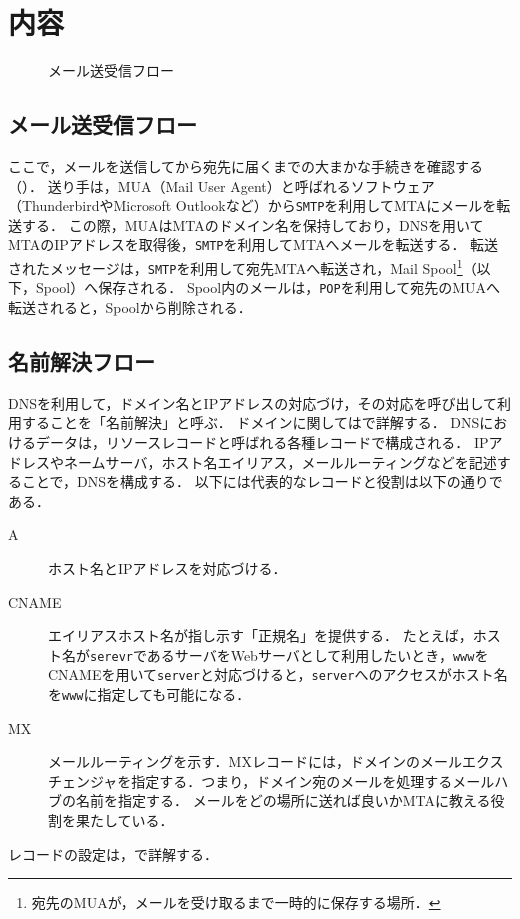 \chapter{内容}
\begin{wrapfigure}{r}[0mm]{.43\textwidth}
    
    \caption{メール送受信フロー\footnotemark[2]}
    \label{fig:メール送受信フロー}
    \vspace{-1cm}
\end{wrapfigure}
\newcommand{\smtp}{\texttt{SMTP}}
\newcommand{\pop}{\texttt{POP}}
\newcommand{\imap}{\texttt{IMAP}}
\section{メール送受信フロー}
ここで，メールを送信してから宛先に届くまでの大まかな手続きを確認する（）．
送り手は，MUA（Mail User Agent）と呼ばれるソフトウェア（ThunderbirdやMicrosoft Outlookなど）から\smtp を利用してMTAにメールを転送する．
この際，MUAはMTAのドメイン名を保持しており，DNSを用いてMTAのIPアドレスを取得後，\smtp を利用してMTAへメールを転送する．
転送されたメッセージは，\smtp を利用して宛先MTAへ転送され，Mail Spool\footnote{宛先のMUAが，メールを受け取るまで一時的に保存する場所．}（以下，Spool）へ保存される．
Spool内のメールは，\pop を利用して宛先のMUAへ転送されると，Spoolから削除される．
\section{名前解決フロー}
DNSを利用して，ドメイン名とIPアドレスの対応づけ，その対応を呼び出して利用することを「名前解決」と呼ぶ．
ドメインに関してはで詳解する．
DNSにおけるデータは，リソースレコードと呼ばれる各種レコードで構成される．
IPアドレスやネームサーバ，ホスト名エイリアス，メールルーティングなどを記述することで，DNSを構成する\cite[p.88]{Postfix実用ガイド}．
以下には代表的なレコードと役割は以下の通りである．
\begin{oframed}
    \begin{description}
        \item[A] ホスト名とIPアドレスを対応づける．
        \item[CNAME] エイリアスホスト名が指し示す「正規名」を提供する．
            たとえば，ホスト名が\texttt{serevr}であるサーバをWebサーバとして利用したいとき，\texttt{www}をCNAMEを用いて\texttt{server}と対応づけると，\texttt{server}へのアクセスがホスト名を\texttt{www}に指定しても可能になる．
        \item[MX] メールルーティングを示す．MXレコードには，ドメインのメールエクスチェンジャを指定する．つまり，ドメイン宛のメールを処理するメールハブの名前を指定する．
            メールをどの場所に送れば良いかMTAに教える役割を果たしている．
    \end{description}
    \hfill\cite[p.88\ -\ p.89]{Postfix実用ガイド}
\end{oframed}
レコードの設定は，で詳解する．
\clearpage
\newcommand{\alias}{\texttt{alias}}
\newcommand{\user}{ユーザ}
